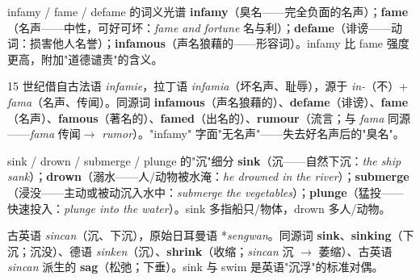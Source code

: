 \documentclass[../main.tex]{subfiles}
\begin{document}
\begin{gram}{infamy / fame / defame 的词义光谱}
\textbf{infamy}（臭名——完全负面的名声）；\textbf{fame}（名声——中性，可好可坏：\textit{fame and fortune} 名与利）；\textbf{defame}（诽谤——动词：损害他人名誉）；\textbf{infamous}（声名狼藉的——形容词）。infamy 比 fame 强度更高，附加"道德谴责"的含义。
\end{gram}

\begin{origin}
15 世纪借自古法语 \textit{infamie}，拉丁语 \textit{infamia}（坏名声、耻辱），源于 \textit{in-}（不）+ \textit{fama}（名声、传闻）。同源词 \textbf{infamous}（声名狼藉的）、\textbf{defame}（诽谤）、\textbf{fame}（名声）、\textbf{famous}（著名的）、\textbf{famed}（出名的）、\textbf{rumour}（流言；与 \textit{fama} 同源——\textit{fama} 传闻$\to$ \textit{rumor}）。"infamy" 字面"无名声"——失去好名声后的"臭名"。
\end{origin}





\begin{gram}{sink / drown / submerge / plunge 的"沉"细分}
\textbf{sink}（沉——自然下沉：\textit{the ship sank}）；\textbf{drown}（溺水——人/动物被水淹：\textit{he drowned in the river}）；\textbf{submerge}（浸没——主动或被动沉入水中：\textit{submerge the vegetables}）；\textbf{plunge}（猛投——快速投入：\textit{plunge into the water}）。sink 多指船只/物体，drown 多人/动物。
\end{gram}

\begin{origin}
古英语 \textit{sincan}（沉、下沉），原始日耳曼语 *\textit{sengwan}。同源词 \textbf{sink}、\textbf{sinking}（下沉；沉没）、德语 \textit{sinken}（沉）、\textbf{shrink}（收缩；\textit{sincan} 沉 $\to$ 萎缩）、古英语 \textit{sincan} 派生的 \textbf{sag}（松弛；下垂）。sink 与 swim 是英语"沉浮"的标准对偶。
\end{origin}
\end{document}
